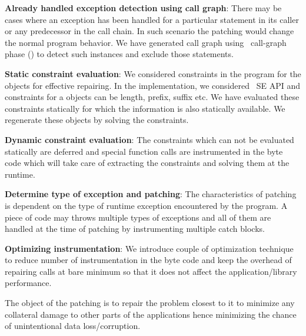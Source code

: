 {\begin{mylist}
\item \textbf{Already handled exception detection using call graph}: There may
be cases where an exception has been handled for a particular statement in its
caller or any predecessor in the call chain. In such scenario the patching would
change the normal program behavior. We have generated call graph using \soot\
call-graph phase () to detect such instances and exclude those
statements.

\item \textbf{Static constraint evaluation}: We considered constraints in the
program for the objects for effective repairing. In the implementation, we
considered \java\ SE  API and constraints for a \code{String} objects
can be length, prefix, suffix etc. We have evaluated these constraints
statically for which the information is also statically available. We regenerate
these objects by solving the constraints.
	
\item \textbf{Dynamic constraint evaluation}: The constraints which can not be
evaluated statically are deferred and special function calls are instrumented in
the byte code which will take care of extracting the constraints and solving
them at the runtime.
	
\item \textbf{Determine type of exception and patching}: The characteristics of
patching is dependent on the type of runtime exception encountered by the
program. A piece of code may throws multiple types of exceptions and all of them
are handled at the time of patching by instrumenting multiple catch blocks.
	
\item \textbf{Optimizing instrumentation}: We introduce couple of optimization
technique to reduce number of instrumentation in the byte code and keep the
overhead of repairing calls at bare minimum so that it does not affect the
application/library performance.

\end{mylist}

The object of the patching is to repair the problem closest to it to minimize
any collateral damage to other parts of the applications hence minimizing the
chance of unintentional data loss/corruption.
}
